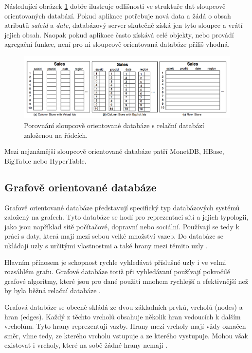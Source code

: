 Následující obrázek \ref{fig:columnDB} dobře ilustruje odlišnosti ve struktuře dat sloupcově orientovaných databází. Pokud aplikace potřebuje nová data a žádá o obsah atributů \emph{saleid} a \emph{date}, databázový server skutečně získá jen tyto sloupce a vrátí jejich obsah. Naopak pokud aplikace často získává celé objekty, nebo provádí agregační funkce, není pro ni sloupcově orientovaná databáze příliš vhodná.

\begin{figure}[h]
\begin{centering}
\includegraphics[scale=0.3]{obrazky/column-vs-row}
\par\end{centering}
\caption{Porovnání sloupcově orientované databáze s relační databází založenou na řádcích. \label{fig:columnDB} \cite{columnDB}}
\end{figure}
Mezi nejznámější sloupcově orientované databáze patří MonetDB, HBase, BigTable nebo HyperTable.

\subsection{Grafově orientované databáze}
Grafově orientované databáze představují specifický typ databázových systémů založený na grafech. Tyto databáze se hodí pro reprezentaci sítí a jejich typologii, jako jsou například sítě počítačové, dopravní nebo sociální. Používají se tedy k práci s daty, která mají mezi sebou velké množství vazeb. Do databáze se ukládají uzly s určitými vlastnostmi a také hrany mezi těmito uzly \cite{graphDb}.

Hlavním přínosem je schopnost rychle vyhledávat příslušné uzly i ve velmi rozsáhlém grafu. Grafové databáze totiž při vyhledávaní používají pokročilé grafové algoritmy, které jsou pro dané použití mnohem rychlejší a efektivnější než by byla běžná relační databáze \cite{graphDb}.  

Grafová databáze se obecně skládá ze dvou základních prvků, vrcholů (nodes) a hran (edges). Každý z těchto vrcholů obsahuje několik hran vedoucích k dalším vrcholům. Tyto hrany reprezentují vazby. Hrany mezi vrcholy mají vždy označen směr, víme tedy, ze kterého vrcholu vstupuje a ze kterého vystupuje. Mohou však existovat i vrcholy, které na sobě žádné hrany nemají \cite{graphDb}. 

